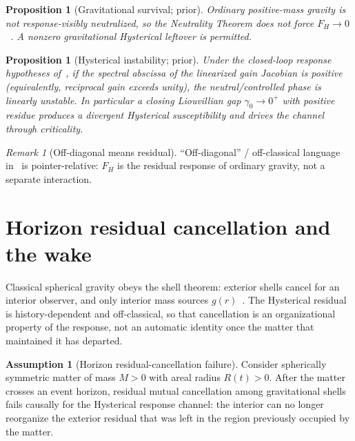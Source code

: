 \documentclass[11pt]{article}
\newtheorem{proposition}[theorem]{Proposition}
\theoremstyle{definition}
\newtheorem{assumption}[theorem]{Assumption}
\theoremstyle{remark}
\newtheorem{remark}[theorem]{Remark}
\newcommand{\FH}{F_H}
\begin{document}
\begin{proposition}[Gravitational survival; prior]
\label{prop:survival}
Ordinary positive-mass gravity is not response-visibly neutralized, so the Neutrality
Theorem does not force $\FH\to0$~\cite{boyd2026response}.
A nonzero gravitational Hysterical leftover is permitted.
\end{proposition}

\begin{proposition}[Hysterical instability; prior]
\label{prop:instab}
Under the closed-loop response hypotheses of~\cite{boyd2026response}, if the spectral
abscissa of the linearized gain Jacobian is positive (equivalently, reciprocal gain
exceeds unity), the neutral/controlled phase is linearly unstable.
In particular a closing Liouvillian gap $\gamma_0\to0^+$ with positive residue produces
a divergent Hysterical susceptibility and drives the channel through criticality.
\end{proposition}

\begin{remark}[Off-diagonal means residual]
\label{rem:offdiag}
``Off-diagonal'' / off-classical language in~\cite{boyd2026response} is pointer-relative:
$\FH$ is the residual response of ordinary gravity, not a separate interaction.
\end{remark}

\section{Horizon residual cancellation and the wake}
\label{sec:wake}
Classical spherical gravity obeys the shell theorem: exterior shells cancel for an
interior observer, and only interior mass sources $g(r)$~\cite{boyd2026response}.
The Hysterical residual is history-dependent and off-classical, so that cancellation is
an organizational property of the response, not an automatic identity once the matter
that maintained it has departed.

\begin{assumption}[Horizon residual-cancellation failure]
\label{ass:horizon}
Consider spherically symmetric matter of mass $M>0$ with areal radius $R(t)>0$.
After the matter crosses an event horizon, residual mutual cancellation among
gravitational shells fails causally for the Hysterical response channel:
the interior can no longer reorganize the exterior residual that was left in the region
previously occupied by the matter.
\end{assumption}
\end{document}
